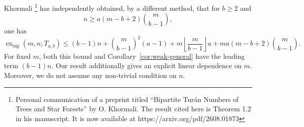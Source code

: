 \documentclass[10pt,a4paper]{amsart}
\newcommand{\exbip}{\operatorname{ex}_{\mathrm{bip}}}
\begin{document}
\noindent Khormali \footnote{Personal communication of a preprint titled ``Bipartite Tur\'an Numbers of Trees and Star Forests'' by O. Khormali. The result cited here is Theorem 1.2 in his manuscript. It is now available at https://arxiv.org/pdf/2608.01873} has independently obtained, by a different method, that for
$b\geq 2$ and
\[
    n\geq a(m-b+2)\binom{m}{b-1},
\]
one has
\[
    \exbip(m,n;T_{a,b})\leq(b-1)n+\binom{m}{b-1}^2(a-1)+m\left\lfloor\frac{m}{b-1}\right\rfloor a+ma(m-b+2)\binom{m}{b-1}.
\]
For fixed $m$, both this bound and Corollary~\ref{cor:weak-general}
have the leading term $(b-1)n$. Our result additionally gives an explicit linear dependence on $m$. Moreover, we do not assume any non-trivial condition on $n$.
\end{document}
